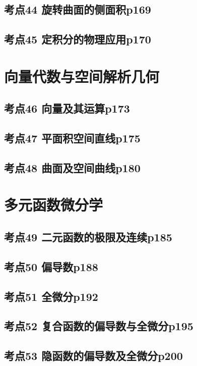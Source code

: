 \section{考点44 旋转曲面的侧面积p169}

\section{考点45 定积分的物理应用p170}

\chapter{向量代数与空间解析几何}

\section{考点46 向量及其运算p173}

\section{考点47 平面积空间直线p175}

\section{考点48 曲面及空间曲线p180}

\chapter{多元函数微分学}

\section{考点49 二元函数的极限及连续p185}

\section{考点50 偏导数p188}

\section{考点51 全微分p192}

\section{考点52 复合函数的偏导数与全微分p195}

\section{考点53 隐函数的偏导数及全微分p200}

